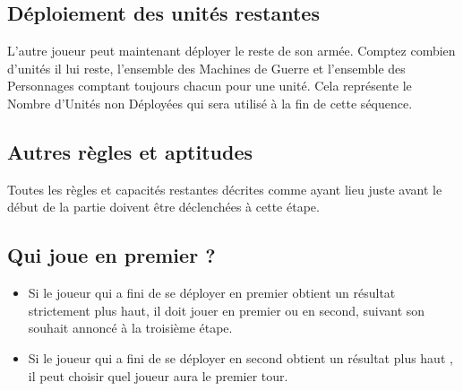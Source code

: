 \subsection{Déploiement des unités restantes}

L'autre joueur peut maintenant déployer le reste de son armée. Comptez combien d'unités il lui reste, l'ensemble des Machines de Guerre et l'ensemble des Personnages comptant toujours chacun pour une unité. Cela représente le \og Nombre d'Unités non Déployées \fg{} qui sera utilisé à la fin de cette séquence.

\subsection{Autres règles et aptitudes}

Toutes les règles et capacités restantes décrites comme ayant lieu juste avant le début de la partie doivent être déclenchées à cette étape.

\subsection{Qui joue en premier ?}

\begin{itemize}[label={-}]
\item Si le joueur qui a fini de se déployer en premier obtient un résultat strictement plus haut, il doit jouer en premier ou en second, suivant son souhait annoncé à la troisième étape.
\item Si le joueur qui a fini de se déployer en second obtient un résultat plus haut , il peut choisir quel joueur aura le premier tour.
\end{itemize}

